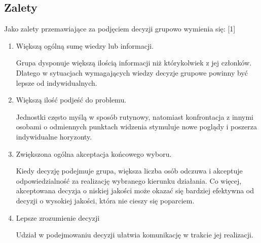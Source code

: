 \subsection{Zalety}
Jako zalety przemawiające za podjęciem decyzji grupowo wymienia się: [1]
\begin{enumerate}

  \item Większą ogólną sumę wiedzy lub informacji.
   
   Grupa dysponuje większą ilością informacji niż którykolwiek z jej członków.
   Dlatego w sytuacjach wymagających wiedzy decyzje grupowe powinny być lepsze
   od indywidualnych.
   
   \item Większą ilość podjeść do problemu.
   
   Jednostki często myślą w sposób rutynowy, natomiast konfrontacja z innymi
   osobami o odmiennych punktach widzenia stymuluje nowe poglądy i poszerza
   indywidualne horyzonty.
   
   \item Zwiększona ogólna akceptacja końcowego wyboru.
   
   Kiedy decyzję podejmuje grupa, większa liczba osób odczuwa i akceptuje
   odpowiedzialność za realizację wybranego kierunku działania. Co więcej,
   akceptowana decyzja o niskiej jakości może okazać się bardziej efektywna od
   decyzji o wysokiej jakości, która nie cieszy się poparciem.
   
   \item Lepsze zrozumienie decyzji
   
   Udział w podejmowaniu decyzji ułatwia komunikację w trakcie jej realizacji.

\end{enumerate}

